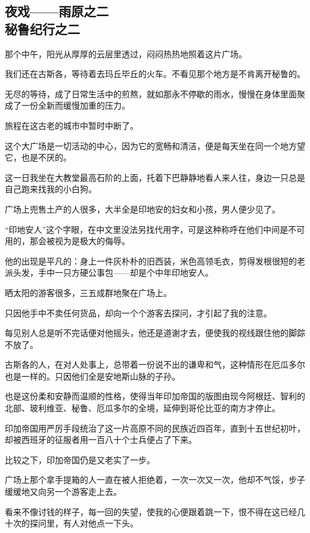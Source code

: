 \subsection{夜戏——雨原之二\\\small{秘鲁纪行之二}}


\par 那个中午，阳光从厚厚的云层里透过，闷闷热热地照着这片广场。
\par 我们还在古斯各，等待着去玛丘毕丘的火车。不看见那个地方是不肯离开秘鲁的。
\par 无尽的等待，成了日常生活中的煎熬，就如那永不停歇的雨水，慢慢在身体里面聚成了一份全新而缓慢加重的压力。
\par 旅程在这古老的城市中暂时中断了。
\par 这个大广场是一切活动的中心，因为它的宽畅和清洁，便是每天坐在同一个地方望它，也是不厌的。
\par 这一日我坐在大教堂最高石阶的上面，托着下巴静静地看人来人往，身边一只总是自己跑来找我的小白狗。
\par 广场上兜售土产的人很多，大半全是印地安的妇女和小孩，男人便少见了。
\par “印地安人”这个字眼，在中文里没法另找代用字，可是这种称呼在他们中间是不可用的，那会被视为是极大的侮辱。
\par 他的出现是平凡的：身上一件灰朴朴的旧西装，米色高领毛衣，剪得发根很短的老派头发，手中一只方硬公事包——却是个中年印地安人。
\par 晒太阳的游客很多，三五成群地聚在广场上。
\par 只因他手中不卖任何货品，却向一个个游客去探问，才引起了我的注意。
\par 每见别人总是听不完话便对他摇头，他还是道谢才去，便使我的视线跟住他的脚踪不放了。
\par 古斯各的人，在对人处事上，总带着一份说不出的谦卑和气，这种情形在厄瓜多尔也是一样的。只因他们全是安地斯山脉的子孙。
\par 也是这份柔和安静而温顺的性格，使得当年印加帝国的版图由现今阿根廷、智利的北部、玻利维亚、秘鲁、厄瓜多尔的全境，延伸到哥伦比亚的南方才停止。
\par 印加帝国用严厉手段统治了这一片高原不同的民族近四百年，直到十五世纪初叶，却被西班牙的征服者用一百八十个士兵便占了下来。
\par 比较之下，印加帝国仍是又老实了一步。
\par 广场上那个拿手提箱的人一直在被人拒绝着，一次一次又一次，他却不气馁，步子缓缓地又向另一个游客走上去。
\par 看来不像讨钱的样子，每一回的失望，使我的心便跟着跳一下，恨不得在这已经几十次的探问里，有人对他点一下头。
